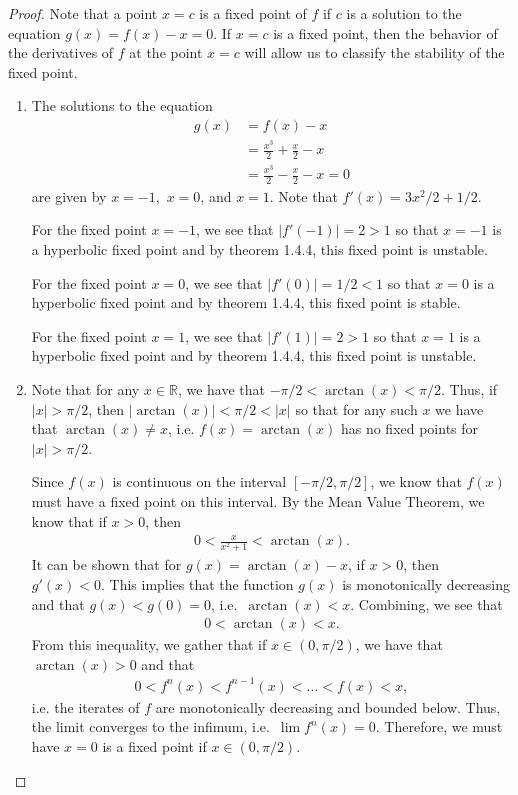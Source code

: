 \begin{proof}
  Note that a point $x=c$ is a fixed point of $f$ if $c$ is a solution to the equation $g(x) = f(x) - x = 0$.
  If $x=c$ is a fixed point, then the behavior of the derivatives of $f$ at the point $x=c$ will allow us
  to classify the stability of the fixed point.

  \begin{enumerate}
    \item The solutions to the equation
      \begin{align*}
        g(x) &= f(x) - x \\
        &= \frac{x^3}{2} + \frac{x}{2} - x \\
        &= \frac{x^3}{2} - \frac{x}{2} - x = 0
      \end{align*}
      are given by $x = -1,$ $x = 0$, and $x = 1$. Note that $f'(x) = 3x^2/{2} + 1/2$.

      For the fixed point $x=-1$, we see that $|f'(-1)| = 2 > 1$ so that $x=-1$ is a hyperbolic fixed point
      and by theorem 1.4.4, this fixed point is unstable.

      For the fixed point $x=0$, we see that $|f'(0)| = 1/2 < 1$ so that $x=0$ is a hyperbolic fixed point
      and by theorem 1.4.4, this fixed point is stable.

      For the fixed point $x=1$, we see that $|f'(1)| = 2 > 1$ so that $x=1$ is a hyperbolic fixed point
      and by theorem 1.4.4, this fixed point is unstable.

    \item Note that for any $x\in\mathbb{R}$, we have that $-\pi/2 < \arctan(x) < \pi/2$.
      Thus, if $|x| > \pi/2$, then $|\arctan(x)| < \pi/2 < |x|$ so that for any such $x$ we have
      that $\arctan(x) \neq x$, i.e. $f(x) = \arctan(x)$ has no fixed points for $|x| > \pi/2$.

      Since $f(x)$ is continuous on the interval $[-\pi/2, \pi/2]$, we know that
      $f(x)$ must have a fixed point on this interval.
      By the Mean Value Theorem, we know that if $x > 0$, then
      \begin{align*}
        0 < \frac{x}{x^2+1} < \arctan(x).
      \end{align*}
      It can be shown that for $g(x) = \arctan(x) - x$, if $x >0$, then $g'(x) < 0$. This implies that the function $g(x)$ is monotonically decreasing
      and that $g(x) < g(0) = 0$, i.e.\ $\arctan(x) < x$. Combining, we see that
      \begin{align*}
        0 < \arctan(x) < x.
      \end{align*}
      From this inequality, we gather that if $x \in (0, \pi/2)$, we have that $\arctan(x) > 0$ and that
      \begin{align*}
        0 < f^{n}(x) < f^{n-1}(x) < \dots < f(x) < x,
      \end{align*}
      i.e. the iterates of $f$ are monotonically decreasing and bounded below. Thus, the limit converges to the infimum, i.e.\
      $\lim f^n(x) = 0$. Therefore, we must have $x=0$ is a fixed point if $x \in (0, \pi/2)$.


\end{enumerate}
\end{proof}
